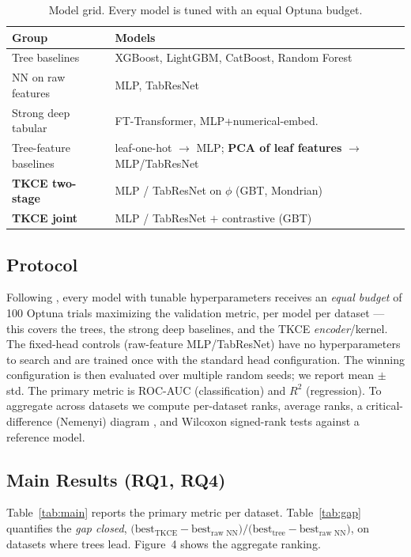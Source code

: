 \documentclass[11pt]{article}
\begin{document}
\begin{table}[t]\centering\small
\caption{Model grid. Every model is tuned with an equal Optuna budget.}
\label{tab:models}
\begin{tabular}{ll}
\toprule
Group & Models \\
\midrule
Tree baselines      & XGBoost, LightGBM, CatBoost, Random Forest \\
NN on raw features  & MLP, TabResNet \\
Strong deep tabular & FT-Transformer, MLP+numerical-embed. \\
Tree-feature baselines & leaf-one-hot $\to$ MLP; \textbf{PCA of leaf features} $\to$ MLP/TabResNet \\
\textbf{TKCE two-stage} & MLP / TabResNet on $\phi$ (GBT, Mondrian) \\
\textbf{TKCE joint}     & MLP / TabResNet $+$ contrastive (GBT) \\
\bottomrule
\end{tabular}
\end{table}

\subsection{Protocol}
Following \citet{grinsztajn2022}, every model with tunable hyperparameters
receives an \emph{equal budget} of 100 Optuna trials maximizing the validation
metric, per model per dataset --- this covers the trees, the strong deep
baselines, and the TKCE \emph{encoder}/kernel. The fixed-head controls
(raw-feature MLP/TabResNet) have no hyperparameters to search and are trained
once with the standard head configuration. The winning configuration is then
evaluated over multiple random seeds; we report mean $\pm$ std. The primary
metric is ROC-AUC (classification) and $R^2$ (regression). To aggregate across
datasets we compute per-dataset ranks, average ranks, a critical-difference
(Nemenyi) diagram \cite{demsar2006}, and Wilcoxon signed-rank tests against a
reference model.

\subsection{Main Results (RQ1, RQ4)}
Table~\ref{tab:main} reports the primary metric per dataset. Table~\ref{tab:gap}
quantifies the \emph{gap closed},
$\big(\text{best}_{\text{TKCE}}-\text{best}_{\text{raw NN}}\big)/
\big(\text{best}_{\text{tree}}-\text{best}_{\text{raw NN}}\big)$, on datasets
where trees lead. Figure~4 shows the aggregate ranking.
\end{document}

